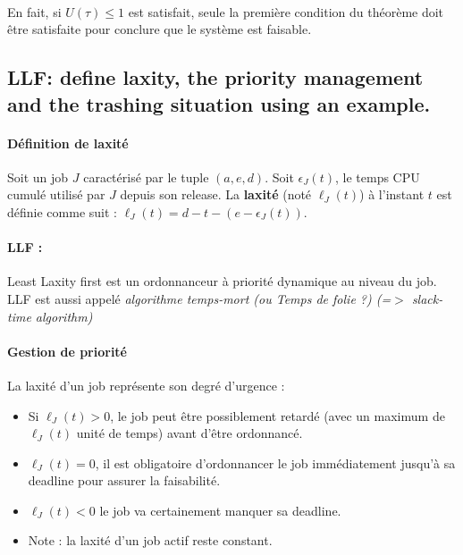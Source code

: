 \paragraph{}
En fait, si $U(\tau) \leq 1$ est satisfait, seule la première condition du théorème doit être satisfaite pour conclure que le système est faisable.


\newpage
\subsection{LLF: define laxity, the priority management and the trashing situation using an example.}
\paragraph{Définition de laxité } Soit un job $J$ caractérisé par le tuple $(a, e, d)$. Soit $\epsilon_{J}(t)$, le temps CPU cumulé utilisé par $J$ depuis son release. La \textbf{laxité} (noté $\ell_{J}(t)$) à l'instant $t$ est définie comme suit : $\ell_{J}(t) =  d − t − (e − \epsilon_{J}(t))$.

\paragraph{LLF : } Least Laxity first est un ordonnanceur à priorité dynamique au niveau du job. LLF est aussi appelé \textit{algorithme temps-mort (ou Temps de folie ?) (=$>$ slack-time algorithm)}

\paragraph{Gestion de priorité} La laxité d'un job représente son degré d'urgence :
\begin{itemize}
\item Si $\ell_{J}(t) > 0$, le job peut être possiblement retardé (avec un maximum de $\ell_{J}(t)$ unité de temps) avant d'être ordonnancé.

\item $\ell_{J}(t) = 0$, il est obligatoire d'ordonnancer le job immédiatement jusqu'à sa deadline pour assurer la faisabilité.

\item $\ell_{J}(t) < 0$ le job va certainement manquer sa deadline.
\item Note : la laxité d'un job actif reste constant.
\end{itemize}

